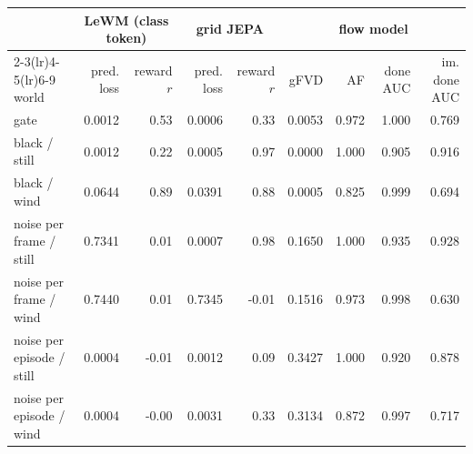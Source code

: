 \begin{tabular}{lrrrrrrrr}
\toprule
 & \multicolumn{2}{c}{LeWM (class token)} & \multicolumn{2}{c}{grid JEPA} & \multicolumn{4}{c}{flow model} \\
\cmidrule(lr){2-3}\cmidrule(lr){4-5}\cmidrule(lr){6-9}
world & pred. loss & reward $r$ & pred. loss & reward $r$ & gFVD & AF & done AUC & im. done AUC \\
\midrule
gate & 0.0012 & 0.53 & 0.0006 & 0.33 & 0.0053 & 0.972 & 1.000 & 0.769 \\
black / still & 0.0012 & 0.22 & 0.0005 & 0.97 & 0.0000 & 1.000 & 0.905 & 0.916 \\
black / wind & 0.0644 & 0.89 & 0.0391 & 0.88 & 0.0005 & 0.825 & 0.999 & 0.694 \\
noise per frame / still & 0.7341 & 0.01 & 0.0007 & 0.98 & 0.1650 & 1.000 & 0.935 & 0.928 \\
noise per frame / wind & 0.7440 & 0.01 & 0.7345 & -0.01 & 0.1516 & 0.973 & 0.998 & 0.630 \\
noise per episode / still & 0.0004 & -0.01 & 0.0012 & 0.09 & 0.3427 & 1.000 & 0.920 & 0.878 \\
noise per episode / wind & 0.0004 & -0.00 & 0.0031 & 0.33 & 0.3134 & 0.872 & 0.997 & 0.717 \\
\bottomrule
\end{tabular}
